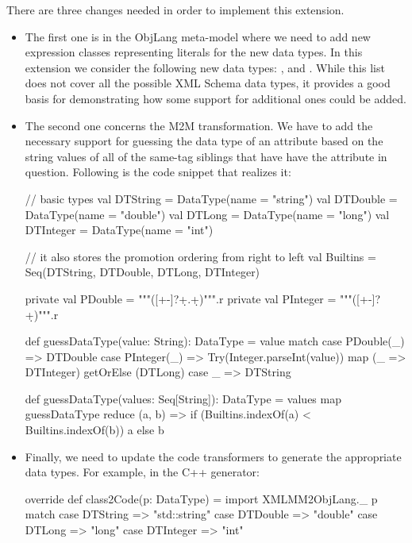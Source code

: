 There are three changes needed in order to implement this extension.
\begin{itemize}[(1)]
	\item The first one is in the ObjLang meta-model where we need to add new expression classes representing literals for the new data types.
	In this extension we consider the following new data types: ,  and .
	While this list does not cover all the possible XML Schema data types, it provides a good basis for demonstrating how some support for additional ones could be added.

	\item The second one concerns the M2M transformation.
	We have to add the necessary support for guessing the data type of an attribute based on the string values of all of the same-tag siblings that have have the attribute in question.
	Following is the code snippet that realizes it:
	\begin{scalacode}
	  // basic types
	  val DTString = DataType(name = "string")
	  val DTDouble = DataType(name = "double")
	  val DTLong = DataType(name = "long")
	  val DTInteger = DataType(name = "int")

	  // it also stores the promotion ordering from right to left
	  val Builtins = Seq(DTString, DTDouble, DTLong, DTInteger)

	  private val PDouble = """([+-]?\d+.\d+)""".r
	  private val PInteger = """([+-]?\d+)""".r

	  def guessDataType(value: String): DataType = value match {
	    case PDouble(_) => DTDouble
	    case PInteger(_) => Try(Integer.parseInt(value)) map (_ => DTInteger) getOrElse (DTLong)
	    case _ => DTString
	  }

	  def guessDataType(values: Seq[String]): DataType =
	    values map guessDataType reduce { (a, b) =>
	      if (Builtins.indexOf(a) < Builtins.indexOf(b)) a else b
	    }
	\end{scalacode}

	\item Finally, we need to update the code transformers to generate the appropriate data types.
	For example, in the C++ generator:
	\begin{scalacode}
override def class2Code(p: DataType) = {
  import XMLMM2ObjLang._
  p match {
    case DTString => "std::string"
    case DTDouble => "double"
    case DTLong => "long"
    case DTInteger => "int"
  }
}		
	\end{scalacode}
\end{itemize}

